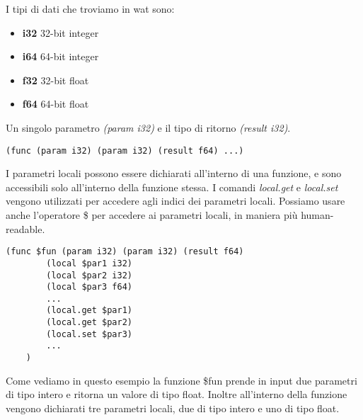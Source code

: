 \documentclass[../../main.tex]{subfiles}
\begin{document}
I tipi di dati che troviamo in wat sono:
\begin{itemize}
    \item \textbf{i32} 32-bit integer
    \item \textbf{i64} 64-bit integer
    \item \textbf{f32} 32-bit float
    \item \textbf{f64} 64-bit float
\end{itemize}
Un singolo  parametro \textit{(param i32)} e il tipo di ritorno \textit{(result i32)}.
\begin{lstlisting}[language=WebAssembly, caption={Esempio di funzione in wat}, label={lst:funzioneWat}]
    (func (param i32) (param i32) (result f64) ...)
\end{lstlisting}
I parametri locali possono essere dichiarati all'interno di una funzione, e sono accessibili solo all'interno della funzione stessa.
I comandi \textit{local.get} e \textit{local.set} vengono utilizzati per accedere agli indici dei parametri locali.
Possiamo usare anche l'operatore \$ per accedere ai parametri locali, in maniera più human-readable.
\begin{lstlisting}[language=WebAssembly, caption={Esempio di funzione in wat}, label={lst:funzioneWat}]
    (func $fun (param i32) (param i32) (result f64)
        (local $par1 i32)
        (local $par2 i32)
        (local $par3 f64)
        ...
        (local.get $par1)
        (local.get $par2)
        (local.set $par3)
        ...
    )
\end{lstlisting}
Come vediamo in questo esempio la funzione \$fun prende in input due parametri di tipo intero e ritorna un valore di tipo float. Inoltre all'interno della funzione vengono dichiarati tre parametri locali, due di tipo intero e uno di tipo float.
\end{document}
